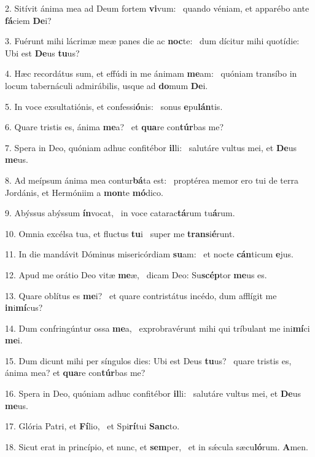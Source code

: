2. Sitívit ánima mea ad Deum fortem \textbf{vi}vum: \ast\  quando véniam, et apparébo ante \textbf{fá}ciem \textbf{De}i?\

3. Fuérunt mihi lácrimæ meæ panes die ac \textbf{noc}te: \ast\  dum dícitur mihi quotídie: Ubi est \textbf{De}us \textbf{tu}us?\

4. Hæc recordátus sum, et effúdi in me ánimam \textbf{me}am: \ast\  quóniam transíbo in locum tabernáculi admirábilis, usque ad \textbf{do}mum \textbf{De}i.\

5. In voce exsultatiónis, et confessi\textbf{ó}nis: \ast\  sonus \textbf{e}pu\textbf{lán}tis.\

6. Quare tristis es, ánima \textbf{me}a? \ast\  et \textbf{qua}re con\textbf{túr}bas me?\

7. Spera in Deo, quóniam adhuc confitébor \textbf{il}li: \ast\  salutáre vultus mei, et \textbf{De}us \textbf{me}us.\

8. Ad meípsum ánima mea contur\textbf{bá}ta est: \ast\  proptérea memor ero tui de terra Jordánis, et Hermóniim a \textbf{mon}te \textbf{mó}dico.\

9. Abýssus abýssum \textbf{ín}vocat, \ast\  in voce catarac\textbf{tá}rum tu\textbf{á}rum.\

10. Omnia excélsa tua, et fluctus \textbf{tu}i \ast\  super me \textbf{trans}i\textbf{é}runt.\

11. In die mandávit Dóminus misericórdiam \textbf{su}am: \ast\  et nocte \textbf{cán}ticum \textbf{e}jus.\

12. Apud me orátio Deo vitæ \textbf{me}æ, \ast\  dicam Deo: Su\textbf{scép}tor \textbf{me}us es.\

13. Quare oblítus es \textbf{me}i? \ast\  et quare contristátus incédo, dum afflígit me \textbf{in}i\textbf{mí}cus?\

14. Dum confringúntur ossa \textbf{me}a, \ast\  exprobravérunt mihi qui tríbulant me ini\textbf{mí}ci \textbf{me}i.\

15. Dum dicunt mihi per síngulos dies: Ubi est Deus \textbf{tu}us? \ast\  quare tristis es, ánima mea? et \textbf{qua}re con\textbf{túr}bas me?\

16. Spera in Deo, quóniam adhuc confitébor \textbf{il}li: \ast\  salutáre vultus mei, et \textbf{De}us \textbf{me}us.\

17. Glória Patri, et \textbf{Fí}lio, \ast\  et Spi\textbf{rí}tui \textbf{Sanc}to.\

18. Sicut erat in princípio, et nunc, et \textbf{sem}per, \ast\  et in sǽcula sæcu\textbf{ló}rum. \textbf{A}men.\


